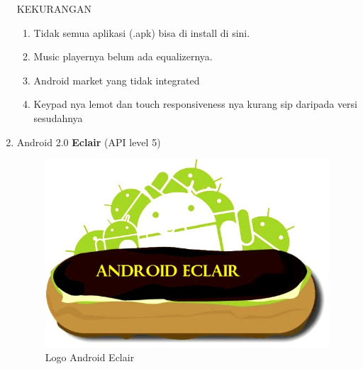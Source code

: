 \begin{enumerate}
KEKURANGAN\\
\begin{enumerate}
    \item Tidak semua aplikasi (.apk) bisa di install di sini.
    \item Music playernya belum ada equalizernya.
    \item Android market yang tidak integrated
    \item Keypad nya lemot dan touch responsiveness nya kurang sip daripada versi sesudahnya
\end{enumerate}


\item Android 2.0 \textbf{Eclair} (API level 5)\\
\begin{figure}[!htbp]
    \centering
    \includegraphics[scale=0.3]{pictures/android-eclair.jpg}
    \caption{Logo Android Eclair}
    \label{}
\end{figure}


\end{enumerate}
